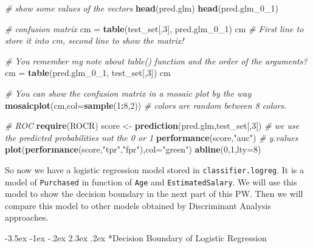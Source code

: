 \documentclass[]{book}
\makeatletter
\newenvironment{Shaded}{\begin{snugshade}}{\end{snugshade}}
\newcommand{\KeywordTok}[1]{\textcolor[rgb]{0.13,0.29,0.53}{\textbf{#1}}}
\newcommand{\DataTypeTok}[1]{\textcolor[rgb]{0.13,0.29,0.53}{#1}}
\newcommand{\DecValTok}[1]{\textcolor[rgb]{0.00,0.00,0.81}{#1}}
\newcommand{\StringTok}[1]{\textcolor[rgb]{0.31,0.60,0.02}{#1}}
\newcommand{\CommentTok}[1]{\textcolor[rgb]{0.56,0.35,0.01}{\textit{#1}}}
\newcommand{\OperatorTok}[1]{\textcolor[rgb]{0.81,0.36,0.00}{\textbf{#1}}}
\newcommand{\NormalTok}[1]{#1}
\renewcommand\section{\@startsection {section}{1}{\z@}%
                                   {-3.5ex \@plus -1ex \@minus -.2ex}%
                                   {2.3ex \@plus.2ex}%
                                   {\normalfont\Large\bfseries\color{ForestGreen}}}
\theoremstyle{definition}
\theoremstyle{definition}
\theoremstyle{definition}
\theoremstyle{remark}
\makeatother
\begin{document}
\begin{Shaded}
\begin{Highlighting}[]
\CommentTok{# show some values of the vectors}
\KeywordTok{head}\NormalTok{(pred.glm)}
\KeywordTok{head}\NormalTok{(pred.glm_0_}\DecValTok{1}\NormalTok{)}

\CommentTok{# confusion matrix}
\NormalTok{cm =}\StringTok{ }\KeywordTok{table}\NormalTok{(test_set[,}\DecValTok{3}\NormalTok{], pred.glm_0_}\DecValTok{1}\NormalTok{)}
\NormalTok{cm}
\CommentTok{# First line to store it into cm, second line to show the matrix! }

\CommentTok{# You remember my note about table() function and the order of the arguments?}
\NormalTok{cm =}\StringTok{ }\KeywordTok{table}\NormalTok{(pred.glm_0_}\DecValTok{1}\NormalTok{, test_set[,}\DecValTok{3}\NormalTok{])}
\NormalTok{cm}

\CommentTok{# You can show the confusion matrix in a mosaic plot by the way}
\KeywordTok{mosaicplot}\NormalTok{(cm,}\DataTypeTok{col=}\KeywordTok{sample}\NormalTok{(}\DecValTok{1}\OperatorTok{:}\DecValTok{8}\NormalTok{,}\DecValTok{2}\NormalTok{)) }\CommentTok{# colors are random between 8 colors.}

\CommentTok{# ROC}
\KeywordTok{require}\NormalTok{(ROCR)}
\NormalTok{score <-}\StringTok{ }\KeywordTok{prediction}\NormalTok{(pred.glm,test_set[,}\DecValTok{3}\NormalTok{]) }\CommentTok{# we use the predicted probabilities not the 0 or 1}
\KeywordTok{performance}\NormalTok{(score,}\StringTok{"auc"}\NormalTok{) }\CommentTok{# y.values}
\KeywordTok{plot}\NormalTok{(}\KeywordTok{performance}\NormalTok{(score,}\StringTok{"tpr"}\NormalTok{,}\StringTok{"fpr"}\NormalTok{),}\DataTypeTok{col=}\StringTok{"green"}\NormalTok{)}
\KeywordTok{abline}\NormalTok{(}\DecValTok{0}\NormalTok{,}\DecValTok{1}\NormalTok{,}\DataTypeTok{lty=}\DecValTok{8}\NormalTok{)}
\end{Highlighting}
\end{Shaded}

So now we have a logistic regression model stored in
\texttt{classifier.logreg}. It is a model of \texttt{Purchased} in
function of \texttt{Age} and \texttt{EstimatedSalary}. We will use this
model to show the decision boundary in the next part of this PW. Then we
will compare this model to other models obtained by Discriminant
Analysis approaches.

\section*{Decision Boundary of Logistic
Regression}\label{decision-boundary-of-logistic-regression}
\end{document}

